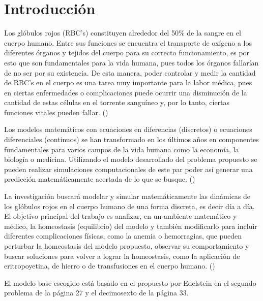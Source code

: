 \chapter{Introducción}\label{chap:intro}
Los glóbulos rojos (RBC's) constituyen alrededor del 50\% de la sangre en el cuerpo humano. Entre sus funciones se encuentra el transporte de oxígeno a los diferentes órganos y tejidos del cuerpo para su correcto funcionamiento, es por esto que son fundamentales para la vida humana, pues todos los órganos fallarían de no ser por su existencia. De esta manera, poder controlar y medir la cantidad de RBC's en el cuerpo es una tarea muy importante para la labor médica, pues en ciertas enfermedades o complicaciones puede ocurrir una disminución de la cantidad de estas células en el torrente sanguíneo y, por lo tanto, ciertas funciones vitales pueden fallar. (\cite{cosgrove2021hematopoiesis}\cite{hall2021guyton}\cite{schippel2023dynamics}\cite{winter2014molecular}\cite{higgins2015red})

Los modelos matemáticos con ecuaciones en diferencias (discretos) o ecuaciones diferenciales (continuos) se han transformado en los últimos años en componentes fundamentales para varios campos de la vida humana como la economía, la biología o medicina. Utilizando el modelo desarrollado del problema propuesto se pueden realizar simulaciones computacionales de este par poder así generar una predicción matemáticamente acertada de lo que se busque. (\cite{edelstein1988mathematical}\cite{liu2023research}\cite{murray2007mathematical})

La investigación buscará modelar y simular matemáticamente las dinámicas de los glóbulos rojos en el cuerpo humano de una forma discreta, es decir día a día. El objetivo principal del trabajo es analizar, en un ambiente matemático y médico, la homeostasis (equilibrio) del modelo y también modificarlo para incluir diferentes complicaciones físicas, como la anemia o hemorragias, que pueden perturbar la homeostasis del modelo propuesto, observar su comportamiento y buscar soluciones para volver a lograr la homeostasis, como la aplicación de eritropoyetina, de hierro o de transfusiones en el cuerpo humano. (\cite{bunn2013erythropoietin}\cite{heras2023anemia}\cite{portoles2021anemia}\cite{shrestha2016models}\cite{kirk1968mathematical})

El modelo base escogido está basado en el propuesto por Edelstein \cite{edelstein1988mathematical} en el segundo problema de la página 27 y el decimosexto de la página 33.

